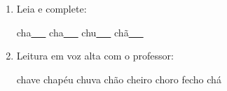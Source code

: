 \begin{exercicio}
\begin{enumerate}[resume]
\begin{enumerate}[label=(\alph*)]
    \item O som da unidade é: ( ) oral ( ) nasal 

    \item A primeira sílaba de CHAVE é: ( ) CHA ( ) CHE

    \item As palavras da unidade aparecem: ( ) no início ( ) no meio ( ) no fim das palavras

  \end{enumerate}

  \item Leia e complete:
  \begin{center}
  cha\underline{~~~} \quad cha\underline{~~~} \quad chu\underline{~~~} \quad chã\underline{~~~}
  \end{center}

  \item Leitura em voz alta com o professor:
  \begin{center}
  chave \quad chapéu \quad chuva \quad chão \quad cheiro \quad choro \quad fecho \quad chá
  \end{center}

\end{enumerate}

\end{exercicio}



